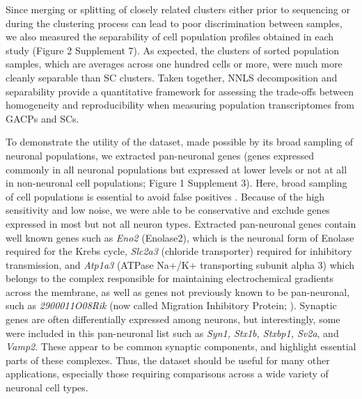 Since merging or splitting of closely related clusters either prior to sequencing or during the clustering process can lead to poor discrimination between samples, we also measured the separability of cell population profiles obtained in each study (Figure 2 Supplement 7). As expected, the clusters of sorted population samples, which are averages across one hundred cells or more, were much more cleanly separable than SC clusters. Taken together, NNLS decomposition and separability provide a quantitative framework for assessing the trade-offs between homogeneity and reproducibility when measuring population transcriptomes from GACPs and SCs. 

To demonstrate the utility of the dataset, made possible by its broad sampling of neuronal  populations, we extracted pan-neuronal genes (genes expressed commonly in all neuronal  populations but expressed at lower levels or not at all in non-neuronal cell populations; Figure 1 Supplement 3). Here, broad sampling of cell populations is essential to avoid false positives \citep{Zhang_2014,Mo_2015,Stefanakis_2015}. Because of the high sensitivity and low noise, we were able to be conservative and exclude genes expressed in most but not all neuron types. Extracted pan-neuronal genes contain well known genes such as \textit{Eno2} (Enolase2), which is the neuronal form of Enolase required for the Krebs cycle, \textit{Slc2a3} (chloride transporter) required for inhibitory transmission, and \textit{Atp1a3} (ATPase Na+/K+ transporting subunit alpha 3) which belongs to the complex responsible for maintaining electrochemical gradients across the membrane, as well as genes not previously known to be pan-neuronal, such as \textit{2900011O08Rik} (now called Migration Inhibitory Protein; \citealt{Zhang_2014a}). Synaptic genes are often differentially expressed among neurons, but interestingly, some were included in this pan-neuronal list such as \textit{Syn1, Stx1b, Stxbp1, Sv2a}, and \textit{Vamp2}. These appear to be common synaptic components, and highlight essential parts of these complexes. Thus, the dataset should be useful for many other applications, especially those requiring comparisons across a wide variety of neuronal cell types. 


